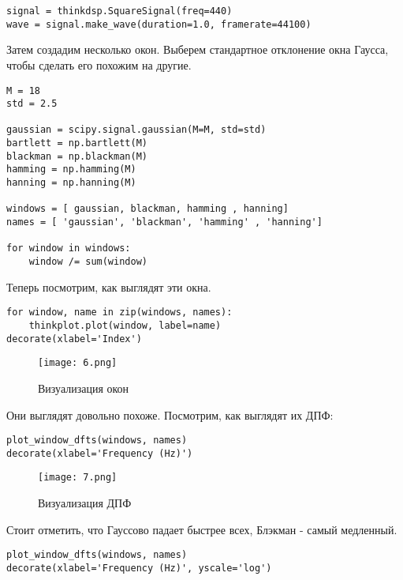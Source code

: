 \documentclass[a4paper,12pt]{report}
\begin{document}
\begin{lstlisting}[caption=Создание сигнала]
signal = thinkdsp.SquareSignal(freq=440)
wave = signal.make_wave(duration=1.0, framerate=44100)
\end{lstlisting}

Затем создадим несколько окон. Выберем стандартное отклонение окна Гаусса, чтобы сделать его похожим на другие.

\begin{lstlisting}[caption=Создание различных окон]
M = 18
std = 2.5

gaussian = scipy.signal.gaussian(M=M, std=std)   
bartlett = np.bartlett(M)
blackman = np.blackman(M)
hamming = np.hamming(M)
hanning = np.hanning(M)

windows = [ gaussian, blackman, hamming , hanning]
names = [ 'gaussian', 'blackman', 'hamming' , 'hanning']

for window in windows:
    window /= sum(window)
\end{lstlisting}

Теперь посмотрим, как выглядят эти окна.

\begin{lstlisting}[caption=Визуализация окон]
for window, name in zip(windows, names):
    thinkplot.plot(window, label=name)
decorate(xlabel='Index')
\end{lstlisting}

\begin{figure}[H]
        \centering
        \texttt{[image: 6.png]}
        \caption{Визуализация окон}
        \label{fig:lab8_fig3_1}
\end{figure}

Они выглядят довольно похоже. Посмотрим, как выглядят их ДПФ:


\begin{lstlisting}[caption=Визуализация ДПФ]
plot_window_dfts(windows, names)
decorate(xlabel='Frequency (Hz)')
\end{lstlisting}

\begin{figure}[H]
        \centering
        \texttt{[image: 7.png]}
        \caption{Визуализация ДПФ}
        \label{fig:lab8_fig3_2}
\end{figure}

Стоит отметить, что Гауссово падает быстрее всех, Блэкман - самый медленный.

\begin{lstlisting}[caption=Визуализация ДПФ]
plot_window_dfts(windows, names)
decorate(xlabel='Frequency (Hz)', yscale='log')
\end{lstlisting}
\end{document}
